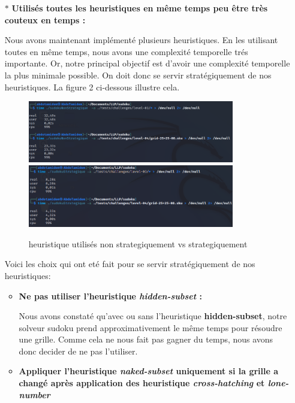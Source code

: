 \documentclass{article}
\begin{document}
\begin{enumerate}
\item[$\ast$] \textbf{Utilisés toutes les heuristiques en même temps peu être très couteux en temps : } \vspace{0.15cm}

Nous avons maintenant implémenté plusieurs heuristiques. En les utilisant toutes en même temps, nous avons une complexité temporelle trés importante. Or, notre principal objectif est d'avoir une complexité temporelle la plus minimale possible. On doit donc se servir stratégiquement de nos heuristiques. La figure 2 ci-dessous illustre cela. 

\begin{figure}[H]
\includegraphics[width=9cm,left]{sansStrategie.png}
\includegraphics[width=9cm,right]{strategique.png}
    \caption{heuristique utilisés non strategiquement vs strategiquement}
\end{figure}

Voici les choix qui ont eté fait pour se servir stratégiquement de nos heuristiques:\vspace{0.2cm}

\begin{itemize}
    \item \textbf{Ne pas utiliser l'heuristique \textit{hidden-subset} :}
    
    Nous avons constaté qu'avec ou sans l'heuristique \textbf{hidden-subset}, notre solveur sudoku prend approximativement le même temps pour résoudre une grille. Comme cela ne nous fait pas gagner du temps, nous avons donc decider de ne pas l'utiliser.\vspace{0.2cm}

    \item \textbf{Appliquer l'heuristique  \textit{naked-subset} uniquement si la grille a changé après application des heuristique \textit{cross-hatching} et \textit{lone-number} }\vspace{0.4cm}


\end{itemize}
\end{enumerate}
\end{document}
